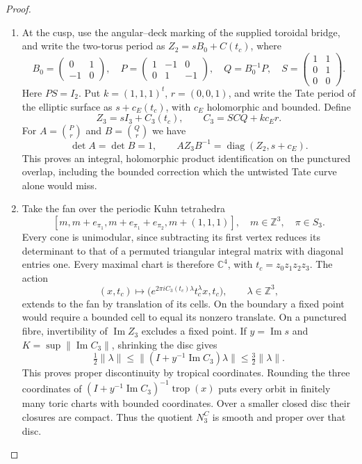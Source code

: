 \begin{proof}
\begin{enumerate}[label=\arabic*.,leftmargin=*]
\item At the cusp, use the angular--deck marking of the supplied toroidal
bridge, and write the two-torus period as
$Z_2=sB_0+C(t_c)$, where
\[
 B_0=\begin{pmatrix}0&1\\-1&0\end{pmatrix},\quad
 P=\begin{pmatrix}1&-1&0\\0&1&-1\end{pmatrix},\quad
 Q=B_0^{-1}P,\quad
 S=\begin{pmatrix}1&1\\0&1\\0&0\end{pmatrix}.
\]
Here $PS=I_2$.  Put $k=(1,1,1)^t$, $r=(0,0,1)$, and write the Tate
period of the elliptic surface as $s+c_E(t_c)$, with $c_E$ holomorphic
and bounded.  Define
\[
 Z_3=sI_3+C_3(t_c),\qquad
 C_3=SCQ+kc_Er.
 \tag{E.2}\label{maps:eq:E.2}
\]
For $A=\binom{P}{r}$ and $B=\binom{Q}{r}$ we have
\[
 \det A=\det B=1,\qquad
 AZ_3B^{-1}=\operatorname{diag}(Z_2,s+c_E).
 \tag{E.3}\label{maps:eq:E.3}
\]
This proves an integral, holomorphic product identification on the
punctured overlap, including the bounded correction which the untwisted
Tate curve alone would miss.

\item Take the fan over the periodic Kuhn tetrahedra
\[
 [m,m+e_{\pi_1},m+e_{\pi_1}+e_{\pi_2},m+(1,1,1)],
 \quad m\in\mathbb Z^3,\quad\pi\in S_3.
 \tag{E.4}\label{maps:eq:E.4}
\]
Every cone is unimodular, since subtracting its first vertex reduces
its determinant to that of a permuted triangular integral matrix with
diagonal entries one.  Every maximal chart is therefore $\mathbb C^4$,
with $t_c=z_0z_1z_2z_3$.  The action
\[
 (x,t_c)\longmapsto
 \bigl(e^{2\pi iC_3(t_c)\lambda}t_c^\lambda x,t_c\bigr),
 \qquad\lambda\in\mathbb Z^3,
 \tag{E.5}\label{maps:eq:E.5}
\]
extends to the fan by translation of its cells.  On the boundary a
fixed point would require a bounded cell to equal its nonzero translate.
On a punctured fibre, invertibility of $\operatorname{Im}Z_3$ excludes
a fixed point.  If $y=\operatorname{Im}s$ and
$K=\sup\|\operatorname{Im}C_3\|$, shrinking the disc gives
\[
 \tfrac12\|\lambda\|\leq
 \|(I+y^{-1}\operatorname{Im}C_3)\lambda\|
 \leq\tfrac32\|\lambda\|.
\]
This proves proper discontinuity by tropical coordinates.  Rounding
the three coordinates of
$(I+y^{-1}\operatorname{Im}C_3)^{-1}\operatorname{trop}(x)$ puts every
orbit in finitely many toric charts with bounded coordinates.  Over a
smaller closed disc their closures are compact.  Thus the quotient
$N_3^C$ is smooth and proper over that disc.


\end{enumerate}
\end{proof}
